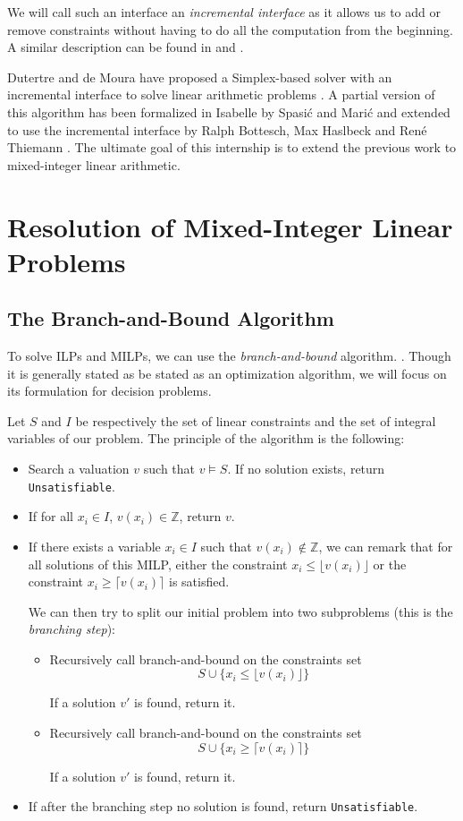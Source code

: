 \documentclass{article}
\newcommand{\cunsat}{\texttt{Unsatisfiable}}
\newcommand{\ints}{\mathbb{Z}}
\begin{document}
We will call such an interface an \textit{incremental interface} as it allows
us to add or remove constraints without having to do all the computation from
the beginning. A similar description can be found in \cite{Dutertre2006} and
\cite{Thiemann2018,BHT2019}.

Dutertre and de Moura have proposed a Simplex-based solver with an incremental
interface to solve linear arithmetic problems
\cite{Dutertre2006}. A partial version of this algorithm has been
formalized in Isabelle by Spasić and Marić \cite{Spasic2012} and extended to
use the incremental interface by Ralph Bottesch, Max Haslbeck and René Thiemann
\cite{Thiemann2018,BHT2019}. The ultimate goal of this internship is to extend
the previous work to mixed-integer linear arithmetic.

\section{Resolution of Mixed-Integer Linear Problems}
\label{secresolution}

\subsection{The Branch-and-Bound Algorithm}
\label{bbdescr}
To solve ILPs and MILPs, we can use the \textit{branch-and-bound} algorithm.
\cite[Section 5.3]{Decision2016}. Though it is generally stated as
be stated as an optimization algorithm, we will focus on its formulation for
decision problems.

Let $S$ and $I$ be respectively the set of linear constraints and the set of
integral variables of our problem. The principle of the algorithm is the
following:
\begin{itemize}
  \item Search a valuation $v$ such that $v \vDash S$. If no solution exists,
    return \cunsat{}.
  \item If for all $x_i \in I$, $v(x_i) \in \ints$,  return $v$.
  \item If there exists a variable $x_i \in I$ such that
    $v(x_i) \notin \ints$, we can remark that for all solutions of this
    MILP, either the constraint $x_i \leqslant \lfloor v(x_i) \rfloor$ 
    or the constraint $x_i \geqslant \lceil v(x_i) \rceil$ is satisfied.
    
    We can then try to split our initial problem into two subproblems (this is
    the \textit{branching step}):
    \begin{itemize}
      \item Recursively call branch-and-bound on the constraints set
        $$S \cup \{x_i \leqslant \lfloor v(x_i) \rfloor\}$$
        
        If a solution $v'$ is found, return it.
      \item Recursively call branch-and-bound on the constraints set
        $$S \cup \{x_i \geqslant \lceil v(x_i) \rceil\}$$
        
        If a solution $v'$ is found, return it.
    \end{itemize}
  \item If after the branching step no solution is found, return \cunsat{}.
\end{itemize}
\end{document}
